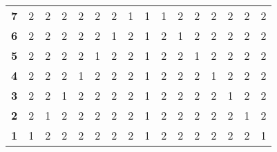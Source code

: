 \documentclass{article}
\begin{document}
\begin{table}[H]
\begin{tabular}{llllllllllllllll}
\multicolumn{1}{l|}{\textbf{7}}  & 2          & 2          & 2          & 2          & 2          & 2          & 1          & 1          & 1          & 2          & 2          & 2          & 2          & 2          & 2          \\
\multicolumn{1}{l|}{\textbf{6}}  & 2          & 2          & 2          & 2          & 2          & 1          & 2          & 1          & 2          & 1          & 2          & 2          & 2          & 2          & 2          \\
\multicolumn{1}{l|}{\textbf{5}}  & 2          & 2          & 2          & 2          & 1          & 2          & 2          & 1          & 2          & 2          & 1          & 2          & 2          & 2          & 2          \\
\multicolumn{1}{l|}{\textbf{4}}  & 2          & 2          & 2          & 1          & 2          & 2          & 2          & 1          & 2          & 2          & 2          & 1          & 2          & 2          & 2          \\
\multicolumn{1}{l|}{\textbf{3}}  & 2          & 2          & 1          & 2          & 2          & 2          & 2          & 1          & 2          & 2          & 2          & 2          & 1          & 2          & 2          \\
\multicolumn{1}{l|}{\textbf{2}}  & 2          & 1          & 2          & 2          & 2          & 2          & 2          & 1          & 2          & 2          & 2          & 2          & 2          & 1          & 2          \\
\multicolumn{1}{l|}{\textbf{1}}  & 1          & 2          & 2          & 2          & 2          & 2          & 2          & 1          & 2          & 2          & 2          & 2          & 2          & 2          & 1         
\end{tabular}
\end{table}
\end{document}
